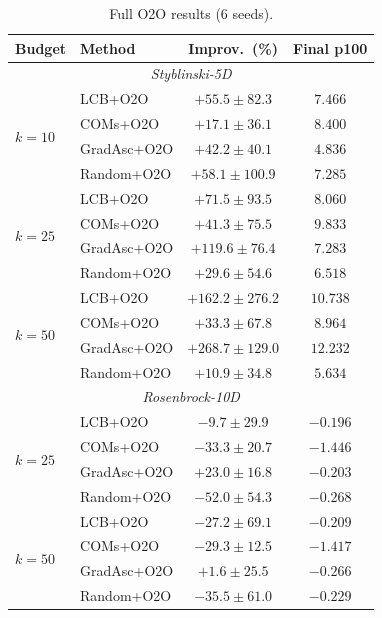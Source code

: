 \documentclass{article}
\theoremstyle{plain}
\theoremstyle{remark}
\begin{document}
\begin{table}[h]
  \caption{Full O2O results (6 seeds).}
  \label{tab:o2o_full}
  \begin{center}
    \begin{small}
      \begin{tabular}{llcc}
        \toprule
        Budget & Method & Improv.\ (\%) & Final p100 \\
        \midrule
        \multicolumn{4}{c}{\textit{Styblinski-5D}} \\
        \midrule
        \multirow{4}{*}{$k{=}10$}
        & LCB+O2O    & $+55.5 \pm 82.3$   & $7.466$  \\
        & COMs+O2O   & $+17.1 \pm 36.1$   & $8.400$  \\
        & GradAsc+O2O  & $+42.2 \pm 40.1$   & $4.836$  \\
        & Random+O2O & $+58.1 \pm 100.9$  & $7.285$  \\
        \midrule
        \multirow{4}{*}{$k{=}25$}
        & LCB+O2O    & $+71.5 \pm 93.5$   & $8.060$  \\
        & COMs+O2O   & $+41.3 \pm 75.5$   & $9.833$  \\
        & GradAsc+O2O  & $+119.6 \pm 76.4$  & $7.283$  \\
        & Random+O2O & $+29.6 \pm 54.6$   & $6.518$  \\
        \midrule
        \multirow{4}{*}{$k{=}50$}
        & LCB+O2O    & $+162.2 \pm 276.2$ & $10.738$ \\
        & COMs+O2O   & $+33.3 \pm 67.8$   & $8.964$  \\
        & GradAsc+O2O  & $+268.7 \pm 129.0$ & $12.232$ \\
        & Random+O2O & $+10.9 \pm 34.8$   & $5.634$  \\
        \midrule
        \multicolumn{4}{c}{\textit{Rosenbrock-10D}} \\
        \midrule
        \multirow{4}{*}{$k{=}25$}
        & LCB+O2O    & $-9.7 \pm 29.9$   & $-0.196$ \\
        & COMs+O2O   & $-33.3 \pm 20.7$  & $-1.446$ \\
        & GradAsc+O2O  & $+23.0 \pm 16.8$  & $-0.203$ \\
        & Random+O2O & $-52.0 \pm 54.3$  & $-0.268$ \\
        \midrule
        \multirow{4}{*}{$k{=}50$}
        & LCB+O2O    & $-27.2 \pm 69.1$  & $-0.209$ \\
        & COMs+O2O   & $-29.3 \pm 12.5$  & $-1.417$ \\
        & GradAsc+O2O  & $+1.6 \pm 25.5$   & $-0.266$ \\
        & Random+O2O & $-35.5 \pm 61.0$  & $-0.229$ \\
        \bottomrule
      \end{tabular}
    \end{small}
  \end{center}
\end{table}
\end{document}
